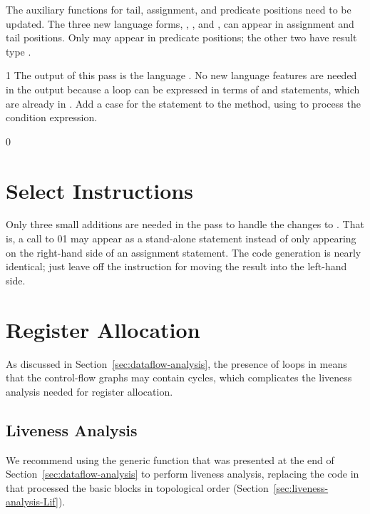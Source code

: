 \documentclass[7x10,nocrop]{TimesAPriori_MIT}%
\def\racketEd{0}
\def\pythonEd{1}
\def\edition{0}
\newcommand{\racket}[1]{{\if\edition\racketEd{#1}\fi}}
\newcommand{\python}[1]{{\if\edition\pythonEd #1\fi}}
\begin{document}
{The auxiliary functions for tail, assignment, and predicate positions
need to be updated. The three new language forms, ,
, and , can appear in assignment and tail
positions.  Only  may appear in predicate positions; the
other two have result type .

\fi}
%
{\if\edition\pythonEd
%
The output of this pass is the language \LangCIf{}. No new language
features are needed in the output because a  loop can be
expressed in terms of  and  statements, which are
already in \LangCIf{}.
%  
Add a case for the  statement to the
 method, using  to process
the condition expression.
%
\fi}

{\if\edition\racketEd
  
\section{Select Instructions}
\label{sec:select-instructions-loop}

Only three small additions are needed in the
 pass to handle the changes to
\LangCLoop{}.  That is, a call to
\racket{}\python{} may appear as a
stand-alone statement instead of only appearing on the right-hand side
of an assignment statement. The code generation is nearly identical;
just leave off the instruction for moving the result into the
left-hand side.

\fi}

\section{Register Allocation}
\label{sec:register-allocation-loop}

As discussed in Section~\ref{sec:dataflow-analysis}, the presence of
loops in \LangLoop{} means that the control-flow graphs may contain cycles,
which complicates the liveness analysis needed for register
allocation.

\subsection{Liveness Analysis}
\label{sec:liveness-analysis-r8}

We recommend using the generic  function that
was presented at the end of Section~\ref{sec:dataflow-analysis} to
perform liveness analysis, replacing the code in
 that processed the basic blocks in topological
order (Section~\ref{sec:liveness-analysis-Lif}).
\end{document}
